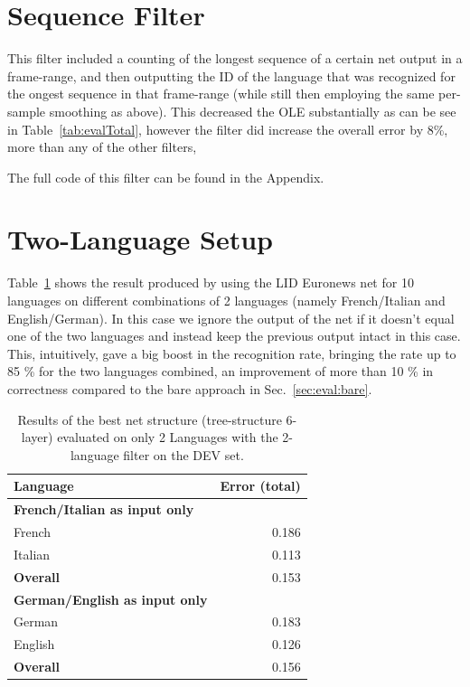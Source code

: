 \section{Sequence Filter}
\label{sec:eval:seq}
This filter included a counting of the longest sequence of a certain net output in a frame-range, and then outputting the ID of the language that was recognized for the ongest sequence in that frame-range (while still then employing the same per-sample smoothing as above). This decreased the OLE substantially as can be see in Table~\ref{tab:evalTotal}, however the filter did increase the overall error by 8\%, more than any of the other filters, 

The full code of this filter can be found in the Appendix.


\section{Two-Language Setup}
\label{sec:eval:2L}
Table~\ref{tab:eval2L} shows the result produced by using the LID Euronews net for 10 languages on different combinations of 2 languages (namely French/Italian and English/German). In this case we ignore the output of the net if it doesn't equal one of the two languages and instead keep the previous output intact in this case. This, intuitively, gave a big boost in the recognition rate, bringing the rate up to 85 \% for the two languages combined, an improvement of more than 10 \% in correctness compared to the bare approach in Sec.~\ref{sec:eval:bare}.

\begin{table}[h!]
\caption{Results of the best net structure (tree-structure 6-layer) evaluated on only 2 Languages with the 2-language filter on the DEV set.}
\label{tab:eval2L}
\centering
\begin{tabular}{| l | r |}
	\hline
	\textbf{Language} & \textbf{Error (total)}  \\
	\hline
	\textbf{French/Italian as input only} & \\
	 French &  0.186 \\
	Italian & 0.113 \\
	\hline
	\textbf{Overall} & 0.153 \\
	\hline
	\textbf{German/English as input only} & \\
	German & 0.183 \\
	English & 0.126 \\
	\hline
	\textbf{Overall} & 0.156 \\
	\hline
\end{tabular}
\end{table}

